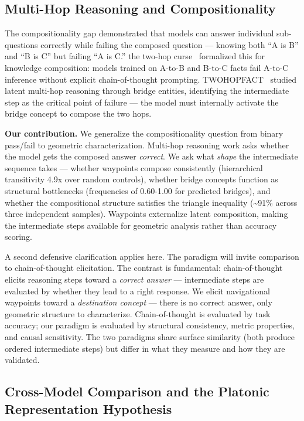 \subsection{Multi-Hop Reasoning and Compositionality}\label{multi-hop-reasoning-and-compositionality}

The compositionality gap \citep{press2022compositionality} demonstrated that models can answer individual sub-questions correctly while failing the composed question --- knowing both ``A is B'' and ``B is C'' but failing ``A is C.'' the two-hop curse~\citep{twohopcurse2025} formalized this for knowledge composition: models trained on A-to-B and B-to-C facts fail A-to-C inference without explicit chain-of-thought prompting. TWOHOPFACT~\citep{twohopfact2024} studied latent multi-hop reasoning through bridge entities, identifying the intermediate step as the critical point of failure --- the model must internally activate the bridge concept to compose the two hops.

\textbf{Our contribution.} We generalize the compositionality question from binary pass/fail to geometric characterization. Multi-hop reasoning work asks whether the model gets the composed answer \emph{correct}. We ask what \emph{shape} the intermediate sequence takes --- whether waypoints compose consistently (hierarchical transitivity 4.9x over random controls), whether bridge concepts function as structural bottlenecks (frequencies of 0.60-1.00 for predicted bridges), and whether the compositional structure satisfies the triangle inequality (\textasciitilde91\% across three independent samples). Waypoints externalize latent composition, making the intermediate steps available for geometric analysis rather than accuracy scoring.

A second defensive clarification applies here. The paradigm will invite comparison to chain-of-thought elicitation. The contrast is fundamental: chain-of-thought elicits reasoning steps toward a \emph{correct answer} --- intermediate steps are evaluated by whether they lead to a right response. We elicit navigational waypoints toward a \emph{destination concept} --- there is no correct answer, only geometric structure to characterize. Chain-of-thought is evaluated by task accuracy; our paradigm is evaluated by structural consistency, metric properties, and causal sensitivity. The two paradigms share surface similarity (both produce ordered intermediate steps) but differ in what they measure and how they are validated.

\subsection{Cross-Model Comparison and the Platonic Representation Hypothesis}\label{cross-model-comparison-and-the-platonic-representation-hypothesis}

